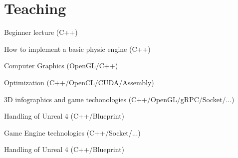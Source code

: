 \documentclass[a4paper]{deedy-resume} %
\begin{document}
\begin{minipage}[t]{0.66\textwidth} %


\section{Teaching}


	\vspace{\topsep} %
	\begin{tightitemize}
		\item Beginner lecture (C++)
		\item How to implement a basic physic engine (C++)
		\item Computer Graphics (OpenGL/C++)
		\item Optimization (C++/OpenCL/CUDA/Assembly)
	\end{tightitemize}

\sectionspace


	\begin{tightitemize}
		\item 3D infographics and game techonologies (C++/OpenGL/gRPC/Socket/...)
		\item Handling of Unreal 4 (C++/Blueprint)
	\end{tightitemize}

\sectionspace


	\begin{tightitemize}
		\item Game Engine technologies (C++/Socket/...)
		\item Handling of Unreal 4 (C++/Blueprint)
	\end{tightitemize}

\sectionspace


\end{minipage}
\end{document}
